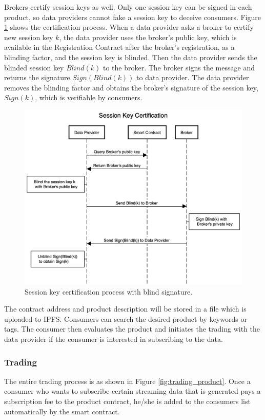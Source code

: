 \documentclass[journal,article,applsci,submit,moreauthors,pdftex]{Definitions/mdpi}
\begin{document}
Brokers certify session keys as well. Only one session key can be signed in each product, so data providers cannot fake a session key to deceive consumers. Figure \ref{fig:key_certification} shows the certification process. When a data provider asks a broker to certify new session key $k$, the data provider uses the broker's public key, which is available in the Registration Contract after the broker's registration, as a blinding factor, and the session key is blinded. Then the data provider sends the blinded session key $Blind(k)$ to the broker. The broker signs the message and returns the signature $Sign(Blind(k))$ to data provider. The data provider removes the blinding factor and obtains the broker's signature of the session key, $Sign(k)$, which is verifiable by consumers.

\begin{figure}[H]
    \centering
    \includegraphics[width=5.5 in]{key_certification}
    \caption{Session key certification process with blind signature.}
    \label{fig:key_certification}
\end{figure}

The contract address and product description will be stored in a file which is uploaded to IPFS. Consumers can search the desired product by keywords or tags. The consumer then evaluates the product and initiates the trading with the data provider if the consumer is interested in subscribing to the data.

\subsubsection{Trading}
The entire trading process is as shown in Figure \ref{fig:trading_product}. Once a consumer who wants to subscribe certain streaming data that is generated  pays a subscription fee to the product contract, he/she is added to the consumers list automatically by the smart contract.
\end{document}
